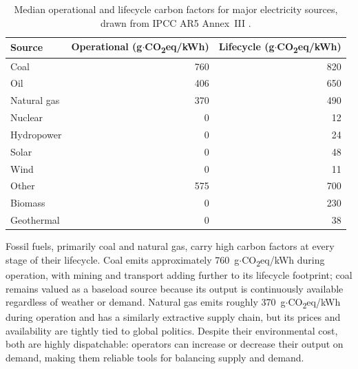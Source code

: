 \begin{table}[h]
    \centering
    \caption[Median operational and lifecycle carbon factors for major electricity sources.]{Median operational and lifecycle carbon factors for major electricity sources, drawn from IPCC AR5 Annex~III \cite{ipcc_carbon_factors_2014}.}
    \label{tab:bg-emissions}
    \begin{tabular}{lrr}
    \hline
    Source & Operational (g$\cdot$CO\textsubscript{2}eq/kWh) & Lifecycle (g$\cdot$CO\textsubscript{2}eq/kWh) \\
    \hline
    Coal & 760 & 820 \\
    Oil & 406 & 650 \\
    Natural gas & 370 & 490 \\
    Nuclear & 0 & 12 \\
    Hydropower & 0 & 24 \\
    Solar & 0 & 48 \\
    Wind & 0 & 11 \\
    Other & 575 & 700 \\ 
    Biomass & 0 & 230 \\
    Geothermal & 0 & 38 \\
    \hline
    \end{tabular}
\end{table}

Fossil fuels, primarily coal and natural gas, carry high carbon factors at every stage of their lifecycle.
Coal emits approximately 760~g$\cdot$CO\textsubscript{2}eq/kWh during operation, with mining and transport adding further to its lifecycle footprint; coal remains valued as a baseload source because its output is continuously available regardless of weather or demand.
Natural gas emits roughly 370~g$\cdot$CO\textsubscript{2}eq/kWh during operation and has a similarly extractive supply chain, but its prices and availability are tightly tied to global politics.
Despite their environmental cost, both are highly dispatchable: operators can increase or decrease their output on demand, making them reliable tools for balancing supply and demand.


